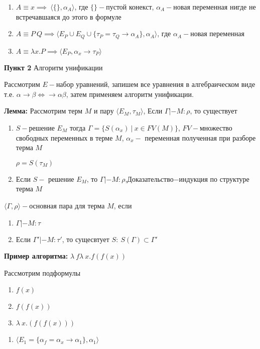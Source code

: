 \documentclass[12pt, a4paper]{article}
\begin{document}
			\begin{enumerate}
				\item $A\equiv x\implies\:\big \langle \{\}, \alpha_A\big\rangle$, где $\{\}-$пустой конекст, $\alpha_A-$новая переменная нигде не встречавшаяся до этого в формуле
				\item $A\equiv P\:Q\implies\big \langle E_P\cup E_Q\cup \{\tau_P=\tau_Q\rightarrow\alpha_A\}, \alpha_A\big \rangle$, где $\alpha_A-$новая переменная
				\item $A\equiv\lambda x.P\implies\big\langle E_P,\alpha_x\rightarrow\tau_P\big\rangle$
			\end{enumerate}
		\textbf{Пункт 2} Алгоритм унификации\par
			Рассмотрим $E-$набор уравнений, запишем все уравнения в алгебраическом виде т.е. $\alpha\rightarrow\beta\Leftrightarrow\rightarrow\alpha\beta$, затем применяем алгоритм унификации.\par
	\textbf{Лемма:} Рассмотрим терм $M$ и пару $\big\langle E_M, \tau_M\big\rangle$, Если $\Gamma|-M:\rho$, то существует 
	\begin{enumerate}
		\item $S-$решение $E_M$ тогда $\Gamma=\{S(\alpha_x)\:|\:x\in FV(M)\}$, $FV-$множество свободных переменных в терме $M$, $\alpha_x-$ переменная полученная при разборе терма $M$\par
		$\rho=S(\tau_M)$
		\item Если $S-$ решение $E_M$, то $\Gamma|-M:\rho$,Доказательство$-$индукция по структуре терма $M$
	\end{enumerate}				
		 $\big \langle\Gamma,\rho\big\rangle-$основная пара для терма $M$, если 
		 \begin{enumerate}
			\item $\Gamma|-M:\tau$
			\item Если $\Gamma'|-M:\tau'$, то сущесвтует $S:\:S(\Gamma)\subset\Gamma'$
		 \end{enumerate}
		 \textbf{Пример алгоритма:}
		 	$\lambda\:f\lambda\:x.f(f(x))$\par
		 	Рассмотрим подформулы
		 	\begin{enumerate}
				\item $f(x)$
				\item $f(f(x))$
				\item $\lambda\:x.(f(f(x)))$		 	
		 	\end{enumerate}
			\begin{enumerate}
				\item $\big\langle E_1=\{\alpha_f=\alpha_x\rightarrow\alpha_1\}, \alpha_1\big\rangle$			
			\end{enumerate}

\end{document}
